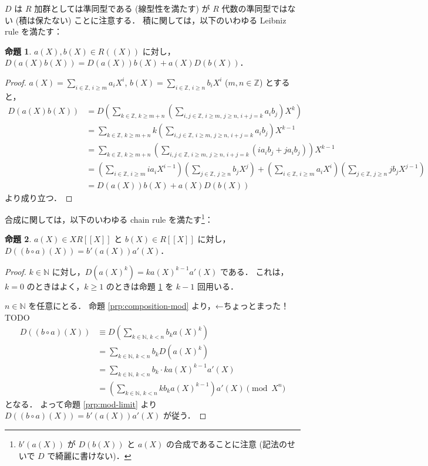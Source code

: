 \documentclass{jsarticle}
\newcommand{\N}{\mathbb{N}}
\newcommand{\Z}{\mathbb{Z}}
\theoremstyle{definition}
\newtheorem{Prp}{命題}
\newenvironment{prp}{\vspace{1ex}\begin{screen}\begin{Prp}}{\end{Prp}\end{screen}}
\newenvironment{prf}{\begin{leftbar}\begin{proof}}{\end{proof}\end{leftbar}}
\begin{document}
$D$ は $R$ 加群としては準同型である (線型性を満たす) が
$R$ 代数の準同型ではない (積は保たない) ことに注意する．
積に関しては，以下のいわゆる Leibniz rule を満たす：

\begin{prp}
  \label{prp:leibniz}
  $a(X), b(X) \in R((X))$ に対し，$D(a(X) b(X)) = D(a(X)) b(X) + a(X) D(b(X))$．
\end{prp}
\begin{prf}
  $a(X) = \sum_{i\in\Z,\,i\ge m} a_i X^i$, $b(X) = \sum_{i\in\Z,\,i\ge n} b_i X^i$ ($m, n \in \Z$) とすると，
  \begin{align*}
    D(a(X) b(X))
    &= D\left(\sum_{k\in\Z,\,k\ge m+n} \left(\sum_{i,j\in\Z,\,i\ge m,\,j\ge n,\,i+j=k} a_i b_j\right) X^k\right) \\
    &= \sum_{k\in\Z,\,k\ge m+n} k \left(\sum_{i,j\in\Z,\,i\ge m,\,j\ge n,\,i+j=k} a_i b_j\right) X^{k-1} \\
    &= \sum_{k\in\Z,\,k\ge m+n} \left(\sum_{i,j\in\Z,\,i\ge m,\,j\ge n,\,i+j=k} (i a_i b_j + j a_i b_j)\right) X^{k-1} \\
    &= \left(\sum_{i\in\Z,\,i\ge m} i a_i X^{i-1}\right) \left(\sum_{j\in\Z,\,j\ge n} b_j X^j\right)
        + \left(\sum_{i\in\Z,\,i\ge m} a_i X^i\right) \left(\sum_{j\in\Z,\,j\ge n} j b_j X^{j-1}\right) \\
    &= D(a(X)) b(X) + a(X) D(b(X))
  \end{align*}
  より成り立つ．
\end{prf}

合成に関しては，以下のいわゆる chain rule を満たす\footnote{$b'(a(X))$ が $D(b(X))$ と $a(X)$ の合成であることに注意 (記法のせいで $D$ で綺麗に書けない)．}：

\begin{prp}
  $a(X) \in X R[[X]]$ と $b(X) \in R[[X]]$ に対し，
  $D((b \circ a)(X)) = b'(a(X)) a'(X)$．
\end{prp}
\begin{prf}
  $k \in \N$ に対し，$D(a(X)^k) = k a(X)^{k-1} a'(X)$ である．
  これは，$k = 0$ のときはよく，$k \ge 1$ のときは命題 \ref{prp:leibniz} を $k - 1$ 回用いる．

  $n \in \N$ を任意にとる．
  命題 \ref{prp:composition-mod} より，←ちょっとまった！ TODO
  \begin{align*}
    D((b \circ a)(X))
    &\equiv D\left(\sum_{k\in\N,\,k<n} b_k a(X)^k\right) \\
    &= \sum_{k\in\N,\,k<n} b_k D(a(X)^k) \\
    &= \sum_{k\in\N,\,k<n} b_k \cdot k a(X)^{k-1} a'(X) \\
    &= \left(\sum_{k\in\N,\,k<n} k b_k a(X)^{k-1}\right) a'(X)
    \pmod{X^n}
  \end{align*}
  となる．
  よって命題 \ref{prp:mod-limit} より $D((b \circ a)(X)) = b'(a(X)) a'(X)$ が従う．
\end{prf}
\end{document}
